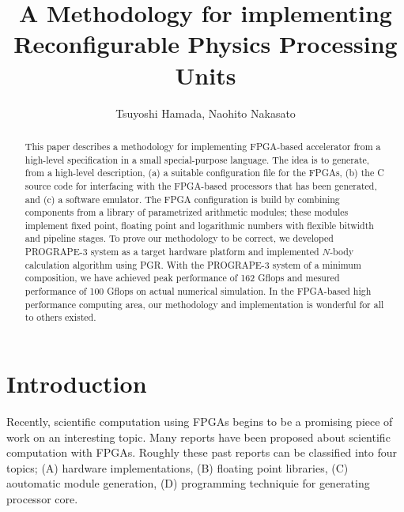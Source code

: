 \documentclass{llncs}
\begin{document}
\def\addtocontents#1#2{}%
\def\addcontentsline#1#2#3{}%
\def\markboth#1#2{}%
%
\title {A Methodology for implementing Reconfigurable Physics Processing Units}

\author{Tsuyoshi Hamada, Naohito Nakasato}


\maketitle
%
\begin{abstract}
This paper describes a methodology for implementing FPGA-based
accelerator from a high-level specification in a small special-purpose
language.  The idea is to generate, from a high-level description, (a)
a suitable configuration file for the FPGAs, (b) the C source code for
interfacing with the FPGA-based processors that has been generated,
and (c) a software emulator. The FPGA configuration is build by
combining components from a library of parametrized arithmetic
modules; these modules implement fixed point, floating point and
logarithmic numbers with flexible bitwidth and pipeline stages. To
prove our methodology to be correct, we developed PROGRAPE-3 system as
a target hardware platform and implemented $N$-body calculation
algorithm using PGR.  With the PROGRAPE-3 system of a minimum
composition, we have achieved peak performance of 162 Gflops and
mesured performance of 100 Gflops on actual numerical simulation.
In the FPGA-based high performance computing area,
our methodology and implementation is wonderful for all to others existed.
\end{abstract}
%
\section{Introduction}
%

Recently, scientific computation using FPGAs begins to be a promising
piece of work on an interesting topic. Many reports have been
proposed about scientific computation with FPGAs. Roughly these past
reports can be classified into four topics; (A) hardware
implementations, (B) floating point libraries, (C) aoutomatic module
generation, (D) programming techniquie for generating processor core.
\end{document}
